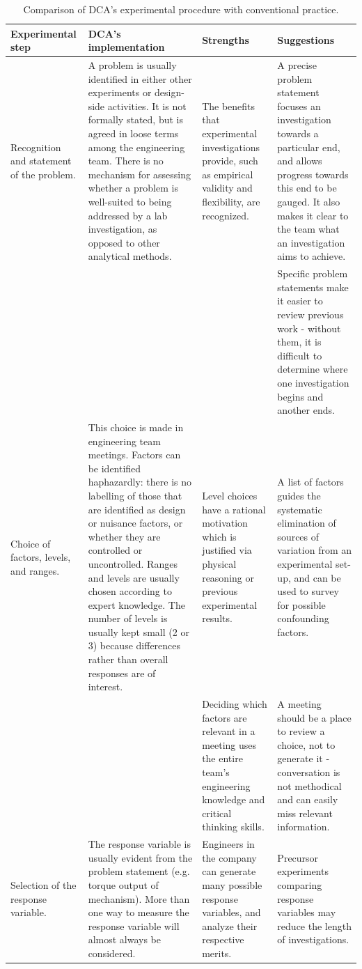 \documentclass[11pt,a4paper,article]{memoir} %
\begin{document}
\begin{landscape}
\vspace*{-3cm}
{\tiny
\begin{longtable}{p{4cm} p{7cm} p{6cm} p{6cm}}
\caption{Comparison of DCA's experimental procedure with conventional practice.}\\
\toprule[0.15em]
\textbf{Experimental step} & \textbf{DCA's implementation} & \textbf{Strengths} & \textbf{Suggestions} \\
\toprule[0.15em]
Recognition and statement of the problem. & A problem is usually identified in either other experiments or design-side activities. It is not formally stated, but is agreed in loose terms among the engineering team. There is no mechanism for assessing whether a problem is well-suited to being addressed by a lab investigation, as opposed to other analytical methods. & The benefits that experimental investigations provide, such as empirical validity and flexibility, are recognized. & A precise problem statement focuses an investigation towards a particular end, and allows progress towards this end to be gauged. It also makes it clear to the team what an investigation aims to achieve. \\ 
 &  &  & Specific problem statements make it easier to review previous work - without them, it is difficult to determine where one investigation begins and another ends. \\ 
\cmidrule{1-4}
Choice of factors, levels, and ranges. & This choice is made in engineering team meetings. Factors can be identified haphazardly: there is no labelling of those that are identified as design or nuisance factors, or whether they are controlled or uncontrolled. Ranges and levels are usually chosen according to expert knowledge. The number of levels is usually kept small (2 or 3) because differences rather than overall responses are of interest. & Level choices have a rational motivation which is justified via physical reasoning or previous experimental results. & A list of factors guides the systematic elimination of sources of variation from an experimental set-up, and can be used to survey for possible confounding factors. \\ 
 &  & Deciding which factors are relevant in a meeting uses the entire team's engineering knowledge and critical thinking skills. & A meeting should be a place to review a choice, not to generate it - conversation is not methodical and can easily miss relevant information. \\ 
\cmidrule{1-4}
Selection of the response variable. & The response variable is usually evident from the problem statement (e.g. torque output of mechanism). More than one way to measure the response variable will almost always be considered. & Engineers in the company can generate many possible response variables, and analyze their respective merits. & Precursor experiments comparing response variables may reduce the length of investigations. \\ 

\end{longtable}}
\end{landscape}
\end{document}
